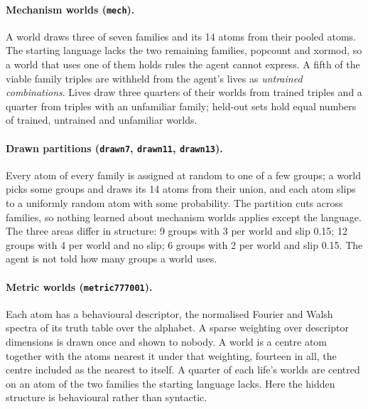 \documentclass[11pt]{article}
\begin{document}
\paragraph{Mechanism worlds (\texttt{mech}).} A world draws three of seven families and its 14 atoms from their pooled atoms. The starting language lacks the two remaining families, popcount and xormod, so a world that uses one of them holds rules the agent cannot express. A fifth of the viable family triples are withheld from the agent's lives as \emph{untrained combinations}. Lives draw three quarters of their worlds from trained triples and a quarter from triples with an unfamiliar family; held-out sets hold equal numbers of trained, untrained and unfamiliar worlds.

\paragraph{Drawn partitions (\texttt{drawn7}, \texttt{drawn11}, \texttt{drawn13}).} Every atom of every family is assigned at random to one of a few groups; a world picks some groups and draws its 14 atoms from their union, and each atom slips to a uniformly random atom with some probability. The partition cuts across families, so nothing learned about mechanism worlds applies except the language. The three areas differ in structure: 9 groups with 3 per world and slip 0.15; 12 groups with 4 per world and no slip; 6 groups with 2 per world and slip 0.15. The agent is not told how many groups a world uses.

\paragraph{Metric worlds (\texttt{metric777001}).} Each atom has a behavioural descriptor, the normalised Fourier and Walsh spectra of its truth table over the alphabet. A sparse weighting over descriptor dimensions is drawn once and shown to nobody. A world is a centre atom together with the atoms nearest it under that weighting, fourteen in all, the centre included as the nearest to itself. A quarter of each life's worlds are centred on an atom of the two families the starting language lacks. Here the hidden structure is behavioural rather than syntactic.
\end{document}
